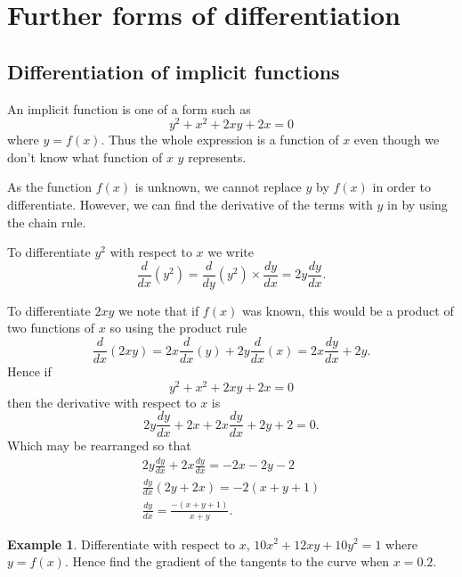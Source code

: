\documentclass[
  11pt,
  oneside]{book}
\newcommand{\slide}{}
\theoremstyle{definition}
\theoremstyle{definition}
\newtheorem{example}{Example}[chapter]
\theoremstyle{definition}
\theoremstyle{definition}
\theoremstyle{remark}
\begin{document}
\slide

\section{Further forms of differentiation}\label{further-forms-of-differentiation}

\subsection{Differentiation of implicit functions}\label{differentiation-of-implicit-functions}

An implicit function is one of a form such as
\[
y^2 + x^2 + 2xy + 2x = 0
\]
where \(y = f(x)\). Thus the whole expression is a function of \(x\) even though we don't know what function of \(x\) \(y\) represents.

As the function \(f(x)\) is unknown, we cannot replace \(y\) by \(f(x)\) in order to differentiate. However, we can find the derivative of the terms with \(y\) in by using the chain rule.

To differentiate \(y^2\) with respect to \(x\) we write
\[
\frac{d}{dx}(y^2) = \frac{d}{dy}(y^2)\times\frac{dy}{dx}= 2y\frac{dy}{dx}.
\]
\slide
To differentiate \(2xy\) we note that if \(f(x)\) was known, this would be a product of two functions of \(x\) so using the product rule
\[
\frac{d}{dx}(2xy) = 2x\frac{d}{dx}(y)+2y\frac{d}{dx}(x) = 2x\frac{dy}{dx} + 2y.
\]
Hence if
\[
y^2 + x^2 + 2xy + 2x = 0
\]
then the derivative with respect to \(x\) is
\[
2y\frac{dy}{dx} + 2x+2x\frac{dy}{dx} +2y+2 = 0.
\]
Which may be rearranged so that
\begin{gather*}
2y\frac{dy}{dx}+2x\frac{dy}{dx} = -2x-2y-2\\
\frac{dy}{dx}(2y+2x) = -2(x+y+1)\\
\frac{dy}{dx} = \frac{-(x+y+1)}{x+y}.
\end{gather*}
\slide

\begin{example}
Differentiate with respect to \(x\), \(10x^2 + 12xy + 10y^2 = 1\) where \(y = f(x)\). Hence find the gradient of the tangents to the curve when \(x=0.2\).
\end{example}
\end{document}
